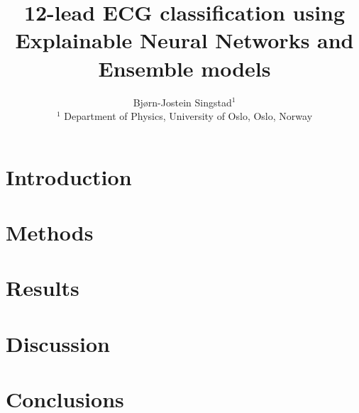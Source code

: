 \documentclass[12pt]{iopart}
\begin{document}
\title{12-lead ECG classification using Explainable Neural Networks and Ensemble models}

\author{ 
Bjørn-Jostein Singstad$^{1}$%
\\
\small{
$^1$ Department of Physics, University of Oslo, Oslo, Norway\\
}}




\begin{abstract}



\end{abstract}


\maketitle


\section{Introduction}


%

\section{Methods}



\section{Results}


\section{Discussion}


\section{Conclusions}

\end{document}
